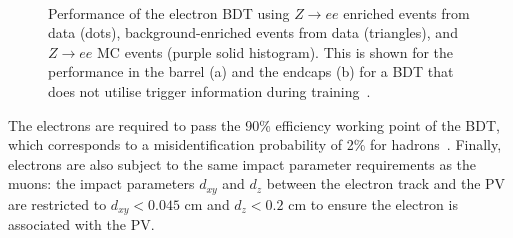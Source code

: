 \begin{figure}[t]
\centering
     \\
\caption[Plots of the electron identification performance.]{Performance of the electron BDT using $Z\rightarrow ee$ enriched events from data (dots), background-enriched events from data (triangles), and $Z\rightarrow ee$ MC events (purple solid histogram). This is shown for the performance in the barrel (a) and the endcaps (b) for a BDT that does not utilise trigger information during training~\cite{CMS:2015xaf}.}
\label{fig:electron_eff}
\end{figure}

The electrons are required to pass the 90\% efficiency working point of the \ac{BDT}, which corresponds to a misidentification probability of 2\% for hadrons~\cite{CMS:2015xaf}. 
Finally, electrons are also subject to the same impact parameter requirements as the muons: the impact parameters $d_{xy}$ and $d_{z}$ between the electron track and the \ac{PV} are restricted to $d_{xy}<0.045$ cm and $d_{z}<0.2$ cm to ensure the electron is associated with the \ac{PV}. \\

